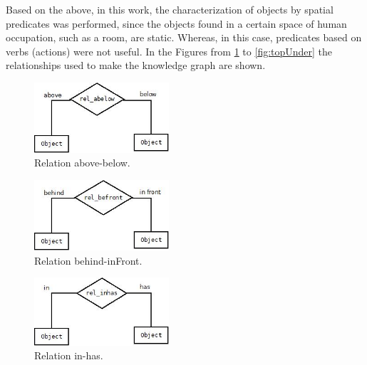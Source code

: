 Based on the above, in this work, the characterization of objects by 
spatial predicates was performed, since the objects found in a certain space 
of human occupation, such as a room, are static. Whereas, in this case, 
predicates based on verbs (actions) were not useful. In the Figures from 
\ref{fig:abelow} to \ref{fig:topUnder} the relationships used to make the 
knowledge graph are shown.

\begin{figure}[H]
    \centering
    \includegraphics[width=5cm]{figures/abelow.jpg}
    \caption{Relation above-below.}
    \label{fig:abelow}
\end{figure}

\begin{figure}[H]
    \centering
    \includegraphics[width=5cm]{figures/befront.jpg}
    \caption{Relation behind-inFront.}
    \label{fig:befront}
\end{figure}

\begin{figure}[H]
    \centering
    \includegraphics[width=5cm]{figures/inhas.jpg}
    \caption{Relation in-has.}
    \label{fig:inhas}
\end{figure}

